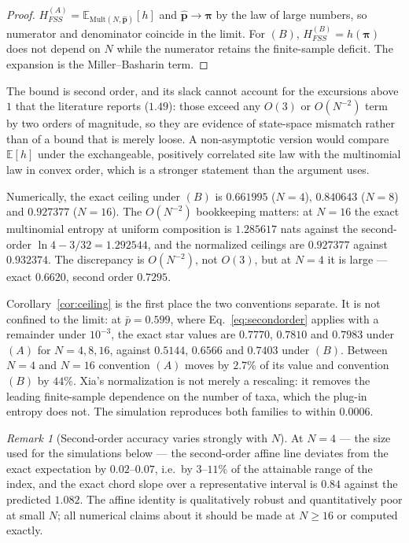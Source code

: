\documentclass[preprint,12pt,authoryear]{elsarticle}
\newcommand{\HFSS}{H_{FSS}}
\newcommand{\bpi}{\boldsymbol{\pi}}
\newcommand{\E}{\mathbb{E}}
\newcommand{\Mult}{\mathrm{Mult}}
\theoremstyle{definition}
\theoremstyle{remark}
\newtheorem{remark}[theorem]{Remark}
\begin{document}
\begin{proof}
$\HFSS^{(A)}=\E_{\Mult(N,\hat{\mathbf p})}[h]$ and
$\hat{\mathbf p}\to\bpi$ by the law of large numbers, so numerator and
denominator coincide in the limit. For $(B)$, $\HFSS^{(B)}=h(\bpi)$ does not
depend on $N$ while the numerator retains the finite-sample deficit. The
expansion is the Miller--Basharin term.
\end{proof}

The bound is second order, and its slack cannot account for the excursions
above $1$ that the literature reports ($1.49$): those exceed any $O(3)$ or
$O(N^{-2})$ term by two orders of magnitude, so they are evidence of
state-space mismatch rather than of a bound that is merely loose. A
non-asymptotic version would compare $\E[h]$ under the exchangeable,
positively correlated site law with the multinomial law in convex order,
which is a stronger statement than the argument uses.

Numerically, the exact ceiling under $(B)$ is $0.661995$ ($N=4$), $0.840643$
($N=8$) and $0.927377$ ($N=16$). The $O(N^{-2})$ bookkeeping matters: at
$N=16$ the exact multinomial entropy at uniform composition is $1.285617$ nats
against the second-order $\ln4-3/32=1.292544$, and the normalized ceilings are
$0.927377$ against $0.932374$. The discrepancy is $O(N^{-2})$, not $O(3)$, but
at $N=4$ it is large --- exact $0.6620$, second order $0.7295$.

Corollary~\ref{cor:ceiling} is the first place the two conventions separate.
It is not confined to the limit: at $\bar p=0.599$, where
Eq.~\eqref{eq:secondorder} applies with a remainder under $10^{-3}$, the exact
star values are $0.7770$, $0.7810$ and $0.7983$ under $(A)$ for $N=4,8,16$,
against $0.5144$, $0.6566$ and $0.7403$ under $(B)$. Between $N=4$ and $N=16$
convention $(A)$ moves by $2.7\%$ of its value and convention $(B)$ by $44\%$.
Xia's normalization is not merely a rescaling: it removes the leading
finite-sample dependence on the number of taxa, which the plug-in entropy does
not. The simulation reproduces both families to within $0.0006$.

\begin{remark}[Second-order accuracy varies strongly with $N$]
\label{rem:accuracy}
At $N=4$ --- the size used for the simulations below --- the second-order
affine line deviates from the exact expectation by $0.02$--$0.07$, i.e.\ by
$3$--$11\%$ of the attainable range of the index, and the exact chord slope
over a representative interval is $0.84$ against the predicted $1.082$. The
affine identity is qualitatively robust and quantitatively poor at small $N$;
all numerical claims about it should be made at $N\ge16$ or computed exactly.
\end{remark}
\end{document}
